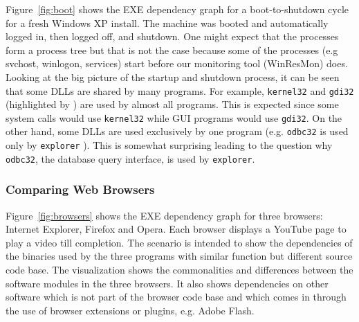Figure~\ref{fig:boot} shows the EXE dependency graph for a boot-to-shutdown cycle
for a fresh Windows XP install.
The machine was booted and automatically logged in,
then logged off, and shutdown. One might expect that the processes
form a process tree but that is not the case because some of the processes (e.g
svchost, winlogon, services) start before our monitoring tool
(WinResMon) does.
Looking at the big picture of the startup and shutdown process,
it can be seen that some DLLs are shared by many programs.
For example, {\tt kernel32} and {\tt gdi32} (highlighted by
) are used by almost all programs.
This is expected since some system calls would use
{\tt kernel32} while GUI programs would use {\tt gdi32}.
On the other hand, some DLLs are used exclusively by one program (e.g.
{\tt odbc32}  is used only by {\tt explorer} ).
This is somewhat surprising leading to the question why {\tt odbc32},
the database query interface, is used by {\tt explorer}.

\subsubsection{Comparing Web Browsers}

Figure~\ref{fig:browsers} shows the EXE dependency graph for three
browsers: Internet Explorer, Firefox and Opera.
Each browser displays a YouTube page to play a
video till completion. The scenario is intended to show the dependencies
of the binaries used by the three programs
with similar function but different source code base.
The visualization shows the commonalities and differences
between the software modules in the three browsers.
It also shows dependencies on other software which is not part of
the browser code base and
which comes in through the use of browser extensions or plugins,
e.g. Adobe Flash.

